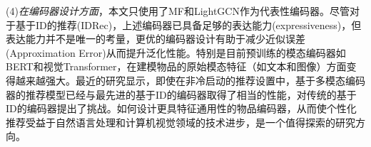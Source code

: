 (4)\textit{在编码器设计方面}，本文只使用了MF和LightGCN作为代表性编码器。尽管对于基于ID的推荐(IDRec)，上述编码器已具备足够的表达能力(expressiveness)，但表达能力并不是唯一的考量，更优的编码器设计有助于减少近似误差(Approximation Error)从而提升泛化性能\cite{sugiyama2022machine}。特别是目前预训练的模态编码器如BERT和视觉Transformer，在建模物品的原始模态特征（如文本和图像）方面变得越来越强大。最近的研究\cite{yuan2023go}显示，即使在非冷启动的推荐设置中，基于多模态编码器的推荐模型已经与最先进的基于ID的编码器取得了相当的性能，对传统的基于ID的编码器提出了挑战。如何设计更具特征通用性的物品编码器，从而使个性化推荐受益于自然语言处理和计算机视觉领域的技术进步，是一个值得探索的研究方向。

